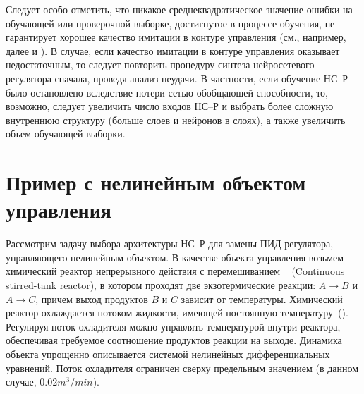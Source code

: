 Следует особо отметить, что никакое среднеквадратическое значение
ошибки на обучающей или проверочной выборке, достигнутое в процессе
обучения, не гарантирует хорошее качество имитации в контуре
управления (см., например, далее
 и
).  В случае, если качество
имитации в контуре управления оказывает недостаточным, то следует
повторить процедуру синтеза нейросетевого регулятора сначала, проведя
анализ неудачи.  В частности, если обучение НС--Р было остановлено
вследствие потери сетью обобщающей способности, то, возможно, следует
увеличить число входов НС--Р и выбрать более сложную внутреннюю
структуру (больше слоев и нейронов в слоях), а также увеличить объем
обучающей выборки.





\section{Пример с нелинейным объектом управления}

Рассмотрим задачу выбора архитектуры НС--Р для замены ПИД регулятора,
управляющего нелинейным объектом.  В качестве объекта управления
возьмем химический реактор непрерывного действия с перемешиванием
~\cite{wiki-cstr} (Continuous stirred-tank reactor), в котором
проходят две экзотермические реакции: $A\rightarrow B$ и $A\rightarrow
C$, причем выход продуктов $B$ и $C$ зависит от температуры.
Химический реактор охлаждается потоком жидкости, имеющей постоянную
температуру~().  Регулируя поток охладителя
можно управлять температурой внутри реактора, обеспечивая требуемое
соотношение продуктов реакции на выходе.  Динамика объекта упрощенно
описывается системой нелинейных дифференциальных уравнений.  Поток
охладителя ограничен сверху предельным значением (в данном случае,
$0.02 m^3/min$).

